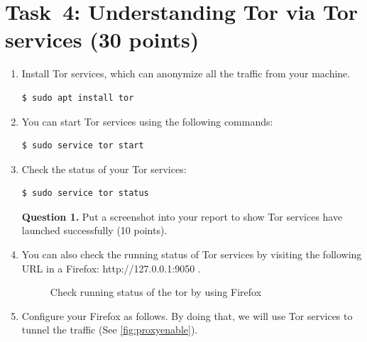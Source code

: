 \documentclass[11pt]{article}
\newcommand{\tor}{{\sf Tor}\xspace}
\begin{document}
\section{Task~4: Understanding \tor via \tor services (30 points)} 
\begin{enumerate}
\item Install \tor services, which can anonymize all the traffic from your machine.
 \begin{lstlisting}
$ sudo apt install tor
\end{lstlisting}\vspace{-6mm}
\item You can start \tor services using the following commands: 
 \begin{lstlisting}
$ sudo service tor start
\end{lstlisting}\vspace{-6mm}




\item Check the status of your \tor services:
 \begin{lstlisting}
$ sudo service tor status
\end{lstlisting}\vspace{-6mm}

\textbf{Question 1.} Put a screenshot into your report to show \tor services have launched successfully (10 points). 


\item You can also check the running status of \tor services by visiting the following URL in a \textsf{Firefox}: http://127.0.0.1:9050 .

\begin{figure}[h]
\centering
{}
\caption{Check running status of the tor by using {\sf Firefox}}\label{fig:proxy}
\end{figure}

\item Configure your \textsf{Firefox} as follows. By doing that, we will use \tor services to tunnel the traffic (See \autoref{fig:proxyenable}). 


\end{enumerate}
\end{document}
